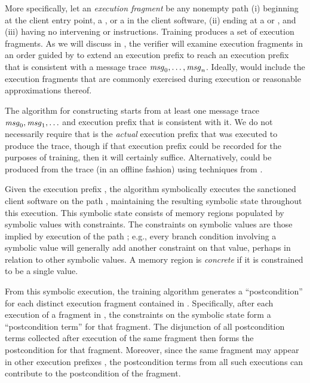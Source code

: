 More specifically, let an \textit{execution fragment} be any nonempty
path (i) beginning at the client entry point, a \selInstr, or a
\sendInstr in the client software, (ii) ending at a \sendInstr or
\recvInstr, and (iii) having no intervening \sendInstr or \recvInstr
instructions.  Training produces a set \trainingFrags{} of execution
fragments.  As we will discuss in , the
verifier will examine execution fragments in an order guided by
\trainingFrags{} to extend an execution prefix 
to reach an execution prefix \execPrefix{\msgNmbr} that is consistent
with a message trace $\mathit{msg}_{0}, \ldots, \mathit{msg}_{n}$.  Ideally,
\trainingFrags{} would include the execution fragments that are
commonly exercised during execution or reasonable approximations
thereof.

The algorithm for constructing \trainingFrags{} starts from at least
one message trace $\mathit{msg}_{0},\mathit{msg}_{1},\ldots$ and execution prefix
\execPrefix{} that is consistent with it.  We do not necessarily
require that \execPrefix{} is the \textit{actual} execution prefix
that was executed to produce the trace, though if that execution
prefix could be recorded for the purposes of training, then it will
certainly suffice.  
Alternatively, \execPrefix{} could be produced from the trace (in an
offline fashion) using techniques from .

Given the execution prefix \execPrefix{}, the algorithm symbolically
executes the sanctioned client software on the path
\execPrefix{}, maintaining the resulting symbolic state throughout
this execution.  This symbolic state consists of memory regions
populated by symbolic values with constraints.  The constraints on
symbolic values are those implied by execution of the path
\execPrefix{}; e.g., every branch condition involving a symbolic value
will generally add another constraint on that value, perhaps in
relation to other symbolic values.  A memory region is
\textit{concrete} if it is constrained to be a single value.

From this symbolic execution, the training algorithm generates a
``postcondition'' for each distinct execution fragment contained in
\execPrefix{}.  Specifically, after each execution of a fragment
in \execPrefix{}, the constraints on the symbolic state
form a ``postcondition term'' for that fragment.  The disjunction of
all postcondition terms collected after execution of the same fragment then
forms the postcondition for that fragment.  Moreover,
since the same fragment may appear in other execution prefixes
\execPrefixAlt{}, the postcondition terms from all such executions can
contribute to the postcondition of the fragment.

